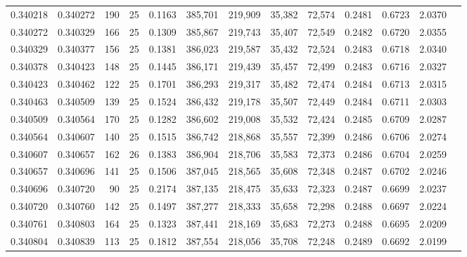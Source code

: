 \begin{tabular}{rrrrrrrrrrrrr}
0.340218 & 0.340272 &   190 &  25 &                                     0.1163 & 385,701 & 219,909 &  35,382 &  72,574 & 0.2481 & 0.6723 & 2.0370 \\
0.340272 & 0.340329 &   166 &  25 &                                     0.1309 & 385,867 & 219,743 &  35,407 &  72,549 & 0.2482 & 0.6720 & 2.0355 \\
0.340329 & 0.340377 &   156 &  25 &                                     0.1381 & 386,023 & 219,587 &  35,432 &  72,524 & 0.2483 & 0.6718 & 2.0340 \\
0.340378 & 0.340423 &   148 &  25 &                                     0.1445 & 386,171 & 219,439 &  35,457 &  72,499 & 0.2483 & 0.6716 & 2.0327 \\
0.340423 & 0.340462 &   122 &  25 &                                     0.1701 & 386,293 & 219,317 &  35,482 &  72,474 & 0.2484 & 0.6713 & 2.0315 \\
0.340463 & 0.340509 &   139 &  25 &                                     0.1524 & 386,432 & 219,178 &  35,507 &  72,449 & 0.2484 & 0.6711 & 2.0303 \\
0.340509 & 0.340564 &   170 &  25 &                                     0.1282 & 386,602 & 219,008 &  35,532 &  72,424 & 0.2485 & 0.6709 & 2.0287 \\
0.340564 & 0.340607 &   140 &  25 &                                     0.1515 & 386,742 & 218,868 &  35,557 &  72,399 & 0.2486 & 0.6706 & 2.0274 \\
0.340607 & 0.340657 &   162 &  26 &                                     0.1383 & 386,904 & 218,706 &  35,583 &  72,373 & 0.2486 & 0.6704 & 2.0259 \\
0.340657 & 0.340696 &   141 &  25 &                                     0.1506 & 387,045 & 218,565 &  35,608 &  72,348 & 0.2487 & 0.6702 & 2.0246 \\
0.340696 & 0.340720 &    90 &  25 &                                     0.2174 & 387,135 & 218,475 &  35,633 &  72,323 & 0.2487 & 0.6699 & 2.0237 \\
0.340720 & 0.340760 &   142 &  25 &                                     0.1497 & 387,277 & 218,333 &  35,658 &  72,298 & 0.2488 & 0.6697 & 2.0224 \\
0.340761 & 0.340803 &   164 &  25 &                                     0.1323 & 387,441 & 218,169 &  35,683 &  72,273 & 0.2488 & 0.6695 & 2.0209 \\
0.340804 & 0.340839 &   113 &  25 &                                     0.1812 & 387,554 & 218,056 &  35,708 &  72,248 & 0.2489 & 0.6692 & 2.0199 \\

\end{tabular}
